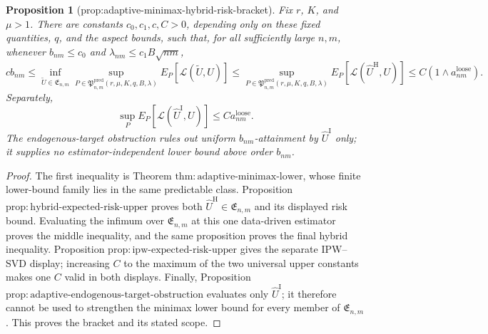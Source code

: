 \documentclass{article}
\newtheorem{proposition}{Proposition}
\begin{document}
\begin{proposition}[prop:adaptive-minimax-hybrid-risk-bracket]\label{prop:adaptive-minimax-hybrid-risk-bracket}
Fix \(r\), \(K\), and \(\mu>1\).  There are constants \(c_0,c_1,c,C>0\), depending only on these fixed quantities, \(q\), and the aspect bounds, such that, for all sufficiently large \(n,m\), whenever \(b_{nm}\le c_0\) and \(\lambda_{nm}\le c_1B\sqrt{nm}\),
\[
 c b_{nm}\le
 \inf_{\widetilde U\in\mathfrak E_{n,m}}
 \sup_{P\in\mathfrak P^{\mathrm{pred}}_{n,m}(r,\mu,K,q,B,\lambda)}
 E_P[\mathcal L(\widetilde U,U)]
 \le
 \sup_{P\in\mathfrak P^{\mathrm{pred}}_{n,m}(r,\mu,K,q,B,\lambda)}
 E_P[\mathcal L(\widehat U^{\mathrm H},U)]
 \le C(1\wedge a^{\mathrm{loose}}_{nm}).
\]
Separately,
\[
 \sup_PE_P[\mathcal L(\widehat U^{\mathrm I},U)]\le C a^{\mathrm{loose}}_{nm}.
\]
The endogenous-target obstruction rules out uniform \(b_{nm}\)-attainment by \(\widehat U^{\mathrm I}\) only; it supplies no estimator-independent lower bound above order \(b_{nm}\).
\end{proposition}
\begin{proof}
The first inequality is Theorem \(\mathrm{thm:adaptive\mbox{-}minimax\mbox{-}lower}\), whose finite lower-bound family lies in the same predictable class.  Proposition \(\mathrm{prop:hybrid\mbox{-}expected\mbox{-}risk\mbox{-}upper}\) proves both \(\widehat U^{\mathrm H}\in\mathfrak E_{n,m}\) and its displayed risk bound.  Evaluating the infimum over \(\mathfrak E_{n,m}\) at this one data-driven estimator proves the middle inequality, and the same proposition proves the final hybrid inequality.  Proposition \(\mathrm{prop:ipw\mbox{-}expected\mbox{-}risk\mbox{-}upper}\) gives the separate IPW--SVD display; increasing \(C\) to the maximum of the two universal upper constants makes one \(C\) valid in both displays.  Finally, Proposition \(\mathrm{prop:adaptive\mbox{-}endogenous\mbox{-}target\mbox{-}obstruction}\) evaluates only \(\widehat U^{\mathrm I}\); it therefore cannot be used to strengthen the minimax lower bound for every member of \(\mathfrak E_{n,m}\).  This proves the bracket and its stated scope.
\end{proof}
\end{document}
